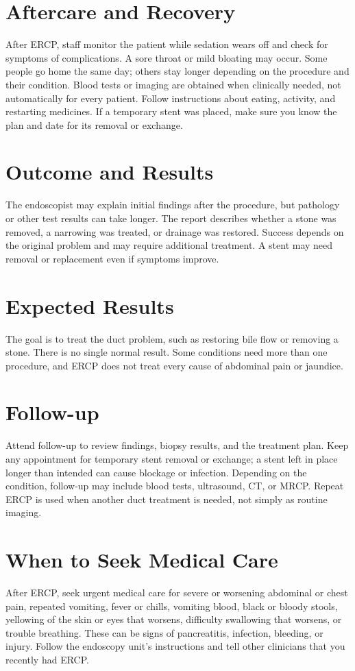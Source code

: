 \section*{Aftercare and Recovery}
After ERCP, staff monitor the patient while sedation wears off and check for symptoms of complications. A sore throat or mild bloating may occur. Some people go home the same day; others stay longer depending on the procedure and their condition. Blood tests or imaging are obtained when clinically needed, not automatically for every patient. Follow instructions about eating, activity, and restarting medicines. If a temporary stent was placed, make sure you know the plan and date for its removal or exchange.

\section*{Outcome and Results}
The endoscopist may explain initial findings after the procedure, but pathology or other test results can take longer. The report describes whether a stone was removed, a narrowing was treated, or drainage was restored. Success depends on the original problem and may require additional treatment. A stent may need removal or replacement even if symptoms improve.

\section*{Expected Results}
The goal is to treat the duct problem, such as restoring bile flow or removing a stone. There is no single normal result. Some conditions need more than one procedure, and ERCP does not treat every cause of abdominal pain or jaundice.

\section*{Follow-up}
Attend follow-up to review findings, biopsy results, and the treatment plan. Keep any appointment for temporary stent removal or exchange; a stent left in place longer than intended can cause blockage or infection. Depending on the condition, follow-up may include blood tests, ultrasound, CT, or MRCP. Repeat ERCP is used when another duct treatment is needed, not simply as routine imaging.

\section*{When to Seek Medical Care}
After ERCP, seek urgent medical care for severe or worsening abdominal or chest pain, repeated vomiting, fever or chills, vomiting blood, black or bloody stools, yellowing of the skin or eyes that worsens, difficulty swallowing that worsens, or trouble breathing. These can be signs of pancreatitis, infection, bleeding, or injury. Follow the endoscopy unit's instructions and tell other clinicians that you recently had ERCP.

